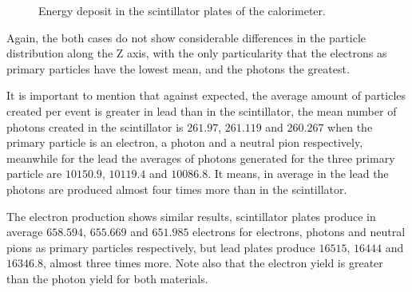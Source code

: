 \begin{figure}[htb!]

  \caption{Energy deposit in the scintillator plates of the calorimeter.}\label{fig:energy-scintillator}

\end{figure}

Again, the both cases do not show considerable differences in the particle
distribution along the Z axis, with the only particularity that the electrons
as primary particles have the lowest mean, and the photons the greatest.

It is important to mention that against expected, the average amount of
particles created per event is greater in lead than in the scintillator, the
mean number of photons created in the scintillator is \(261.97\), \(261.119\)
and \(260.267\) when the primary particle is an electron, a photon and a
neutral pion respectively, meanwhile for the lead the averages of photons
generated for the three primary particle are \(10150.9\), \(10119.4\) and
\(10086.8\). It means, in average in the lead the photons are produced almost
four times more than in the scintillator.

The electron production shows similar results, scintillator plates produce in
average \(658.594\), \(655.669\) and \(651.985\) electrons for electrons,
photons and neutral pions as primary particles respectively, but lead plates
produce \(16515\), \(16444\) and \(16346.8\), almost three times more. Note
also that the electron yield is greater than the photon yield for both
materials.

